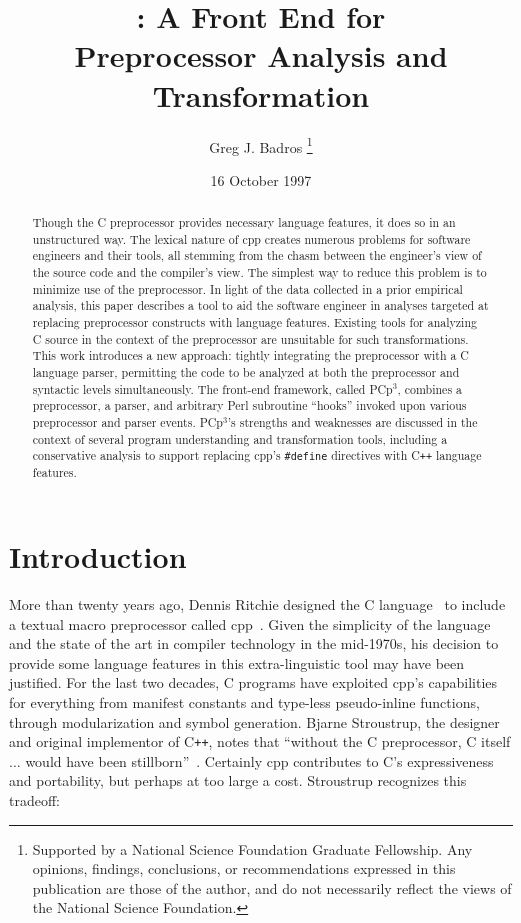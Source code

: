 \documentclass{article}
\title{\pcp{}: A \C{} Front End for \\ Preprocessor Analysis and Transformation}
\author{Greg J. Badros%
  \thanks{\tiny Supported by a National Science Foundation
    Graduate Fellowship. Any opinions, findings, conclusions, or
    recommendations expressed in this publication are those of the
    author, and do not necessarily reflect the views of the National
    Science Foundation.}
  \\  \email{gjb@cs.washington.edu}}
\date{16 October 1997}
\newcommand{\pcp}{\mbox{\textsf{PCp}$^3$}}
\newcommand{\Cpp}{\mbox{\textsf{cpp}}}
\newcommand{\CPP}{\mbox{C\texttt{++}}}
\newcommand{\Perl}{\mbox{Perl}}
\newcommand{\C}{\mbox{C}}
\newcommand{\ppd}[1]{\texttt{\##1}}
\begin{document}
\maketitle

\begin{abstract}
\label{sec:abstract}
Though the \C{} preprocessor provides necessary language features, it
does so in an unstructured way.  The lexical nature of \Cpp{} creates
numerous problems for software engineers and their tools, all stemming
from the chasm between the engineer's view of the source code and the
compiler's view.  The simplest way to reduce this problem is to minimize
use of the preprocessor.  In light of the data collected in a prior
empirical analysis, this paper describes a tool to aid the software
engineer in analyses targeted at replacing preprocessor constructs with language features.
Existing tools for analyzing \C{} source in the context of the
preprocessor are unsuitable for such transformations. This work
introduces a new approach: tightly integrating the preprocessor with a
\C{} language parser, permitting the code to be analyzed at both the
preprocessor and syntactic levels simultaneously.  The front-end
framework, called \pcp{}, combines a preprocessor, a parser, and
arbitrary \Perl{} subroutine ``hooks'' invoked upon various preprocessor
and parser events.  \pcp{}'s strengths and weaknesses are discussed in
the context of several program understanding and transformation tools,
including a conservative analysis to support replacing \Cpp{}'s
\ppd{define} directives with \CPP{} language features.

\end{abstract}
\bigskip

\section{Introduction}
\label{sec:intro}
More than twenty years ago, Dennis Ritchie designed the \C{}
language~\cite{Kernighan88} to include a textual macro preprocessor
called \Cpp{}~\cite[Ch.~3]{Harbison91}.  Given the simplicity of the
language and the state of the art in compiler technology in the
mid-1970s, his decision to provide some language features in this
extra-linguistic tool may have been justified.  For the last two
decades, \C{} programs have exploited \Cpp{}'s capabilities for
everything from manifest constants and type-less pseudo-inline
functions, through modularization and symbol generation.  Bjarne
Stroustrup, the designer and original implementor of \CPP{}, notes that
``without the \C{} preprocessor, \C{} itself $\ldots$ would have been
stillborn''~\cite[p.~119]{Stroustrup94}.  Certainly \Cpp{}
contributes to \C{}'s expressiveness and portability, but
perhaps at too large a cost.  Stroustrup recognizes this tradeoff:
\end{document}

